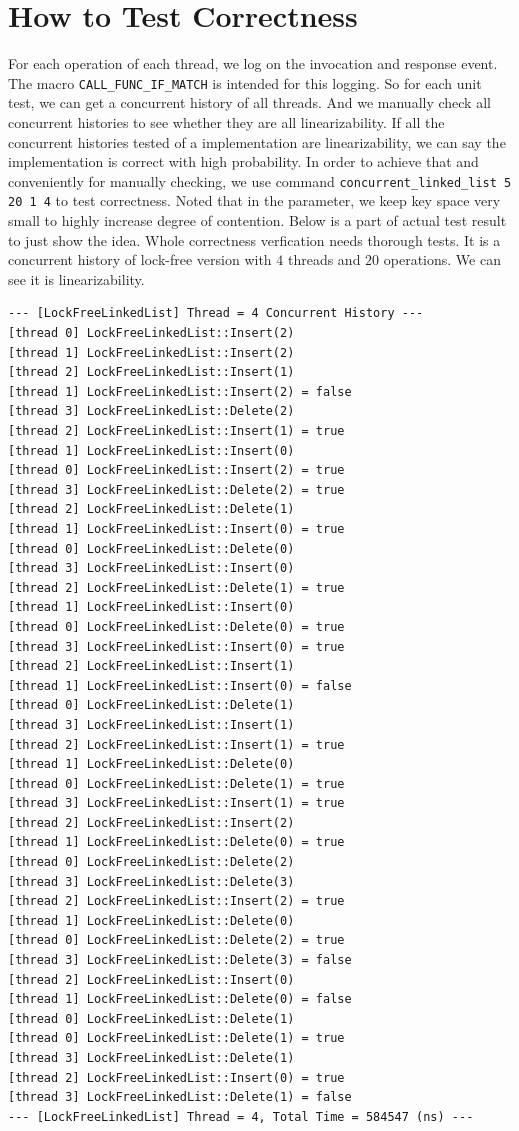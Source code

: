 \documentclass[a4paper]{report}
\begin{document}
\section*{How to Test Correctness}
For each operation of each thread, we log on the invocation and response event. The macro \lstinline{CALL_FUNC_IF_MATCH} is intended for this logging. So for each unit test, we can get a concurrent history of all threads. And we manually check all concurrent histories to see whether they are all linearizability. If all the concurrent histories tested of a implementation are linearizability, we can say the implementation is correct with high probability. In order to achieve that and conveniently for manually checking, we use command \lstinline{concurrent_linked_list 5 20 1 4} to test correctness. Noted that in the parameter, we keep key space very small to highly increase degree of contention. Below is a part of actual test result to just show the idea. Whole correctness verfication needs thorough tests. It is a concurrent history of lock-free version with $4$ threads and $20$ operations. We can see it is linearizability.

\begin{lstlisting}[basicstyle=\ttfamily\scriptsize]
--- [LockFreeLinkedList] Thread = 4 Concurrent History ---
[thread 0] LockFreeLinkedList::Insert(2)
[thread 1] LockFreeLinkedList::Insert(2)
[thread 2] LockFreeLinkedList::Insert(1)
[thread 1] LockFreeLinkedList::Insert(2) = false
[thread 3] LockFreeLinkedList::Delete(2)
[thread 2] LockFreeLinkedList::Insert(1) = true
[thread 1] LockFreeLinkedList::Insert(0)
[thread 0] LockFreeLinkedList::Insert(2) = true
[thread 3] LockFreeLinkedList::Delete(2) = true
[thread 2] LockFreeLinkedList::Delete(1)
[thread 1] LockFreeLinkedList::Insert(0) = true
[thread 0] LockFreeLinkedList::Delete(0)
[thread 3] LockFreeLinkedList::Insert(0)
[thread 2] LockFreeLinkedList::Delete(1) = true
[thread 1] LockFreeLinkedList::Insert(0)
[thread 0] LockFreeLinkedList::Delete(0) = true
[thread 3] LockFreeLinkedList::Insert(0) = true
[thread 2] LockFreeLinkedList::Insert(1)
[thread 1] LockFreeLinkedList::Insert(0) = false
[thread 0] LockFreeLinkedList::Delete(1)
[thread 3] LockFreeLinkedList::Insert(1)
[thread 2] LockFreeLinkedList::Insert(1) = true
[thread 1] LockFreeLinkedList::Delete(0)
[thread 0] LockFreeLinkedList::Delete(1) = true
[thread 3] LockFreeLinkedList::Insert(1) = true
[thread 2] LockFreeLinkedList::Insert(2)
[thread 1] LockFreeLinkedList::Delete(0) = true
[thread 0] LockFreeLinkedList::Delete(2)
[thread 3] LockFreeLinkedList::Delete(3)
[thread 2] LockFreeLinkedList::Insert(2) = true
[thread 1] LockFreeLinkedList::Delete(0)
[thread 0] LockFreeLinkedList::Delete(2) = true
[thread 3] LockFreeLinkedList::Delete(3) = false
[thread 2] LockFreeLinkedList::Insert(0)
[thread 1] LockFreeLinkedList::Delete(0) = false
[thread 0] LockFreeLinkedList::Delete(1)
[thread 0] LockFreeLinkedList::Delete(1) = true
[thread 3] LockFreeLinkedList::Delete(1)
[thread 2] LockFreeLinkedList::Insert(0) = true
[thread 3] LockFreeLinkedList::Delete(1) = false
--- [LockFreeLinkedList] Thread = 4, Total Time = 584547 (ns) ---
\end{lstlisting}
\end{document}
